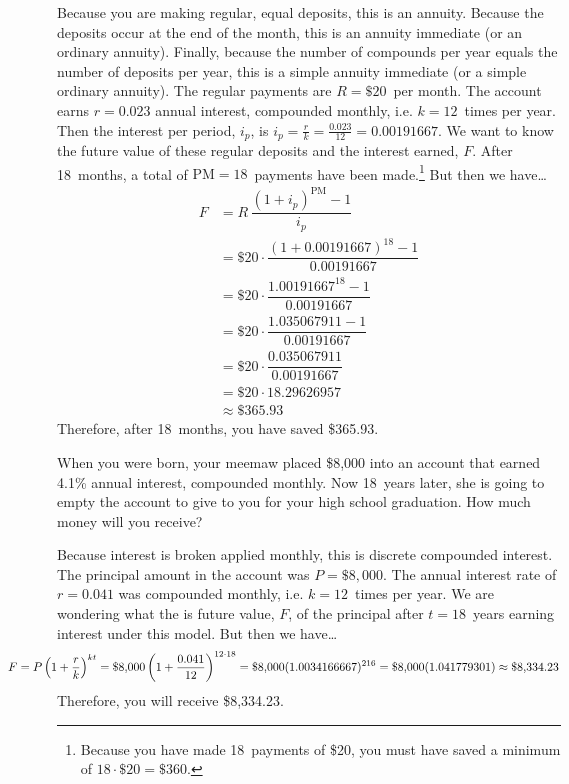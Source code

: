 \documentclass[12pt,letterpaper]{exam}
\begin{document}
\begin{questions}
\sol Because you are making regular, equal deposits, this is an annuity. Because the deposits occur at the end of the month, this is an annuity immediate (or an ordinary annuity). Finally, because the number of compounds per year equals the number of deposits per year, this is a simple annuity immediate (or a simple ordinary annuity). The regular payments are $R= \$20$~per month. The account earns $r= 0.023$ annual interest, compounded monthly, i.e. $k= 12$~times per year. Then the interest per period, $i_p$, is $i_p= \frac{r}{k}= \frac{0.023}{12}= 0.00191667$. We want to know the future value of these regular deposits and the interest earned, $F$. After 18~months, a total of $\text{PM}= 18$~payments have been made.\footnote{Because you have made 18~payments of \$20, you must have saved a minimum of $18 \cdot \$20= \$360$.} But then we have\dots
	\[
	\begin{aligned}
	F&= R\, \dfrac{(1 + i_p)^{\text{PM}} - 1}{i_p} \\[0.3cm]
	&= \$20 \cdot \dfrac{(1 + 0.00191667)^{18} - 1}{0.00191667} \\[0.3cm]
	&= \$20 \cdot \dfrac{1.00191667^{18} - 1}{0.00191667} \\[0.3cm]
	&= \$20 \cdot \dfrac{1.035067911 - 1}{0.00191667} \\[0.3cm]
	&= \$20 \cdot \dfrac{0.035067911}{0.00191667} \\[0.3cm]
	&= \$20 \cdot 18.29626957 \\[0.3cm]
	&\approx   \$365.93
	\end{aligned}
	\]
Therefore, after 18~months, you have saved \$365.93.



\newpage
\question[10] When you were born, your meemaw placed \$8,000 into an account that earned 4.1\% annual interest, compounded monthly. Now 18~years later, she is going to empty the account to give to you for your high school graduation. How much money will you receive? \pspace

\sol Because interest is broken applied monthly, this is discrete compounded interest. The principal amount in the account was $P= \$8,\!000$. The annual interest rate of $r= 0.041$ was compounded monthly, i.e. $k= 12$~times per year. We are wondering what the is future value, $F$, of the principal after $t= 18$~years earning interest under this model. But then we have\dots
	\[
	\hspace{-1.5cm} F= P \left(1 + \dfrac{r}{k} \right)^{kt}= \$8,\!000 \left(1 + \dfrac{0.041}{12} \right)^{12 \cdot 18}= \$8,\!000 (1.0034166667)^{216}= \$8,\!000 (1.041779301) \approx \$8,\!334.23
	\]
Therefore, you will receive \$8,334.23. 




\end{questions}
\end{document}

